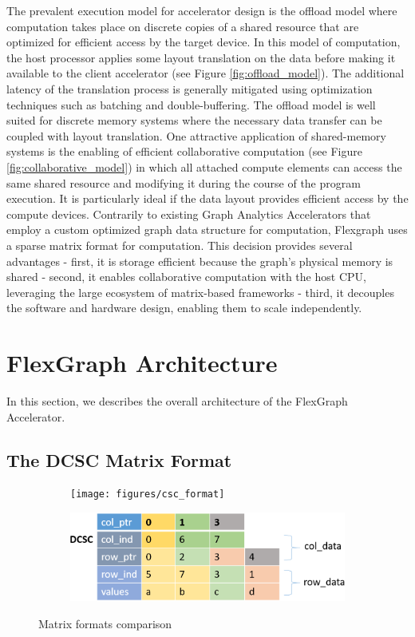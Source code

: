 The prevalent execution model for accelerator design is the offload model \cite{Accelerators} where computation takes place on discrete copies of a shared resource that are optimized for efficient access by the target device. In this model of computation, the host processor applies some layout translation on the data before making it available to the client accelerator (see Figure \ref{fig:offload_model}). The additional latency of the translation process is generally mitigated using optimization techniques such as batching and double-buffering. The offload model is well suited for discrete memory systems where the necessary data transfer can be coupled with layout translation. One attractive application of shared-memory systems is the enabling of efficient collaborative computation (see Figure \ref{fig:collaborative_model}) in which all attached compute elements can access the same shared resource and modifying it during the course of the program execution. It is particularly ideal if the data layout provides efficient access by the compute devices. Contrarily to existing Graph Analytics Accelerators \cite{Graphicionado} \cite{GraphOps} that employ a custom optimized graph data structure for computation, Flexgraph uses a sparse matrix format for computation. This decision provides several advantages - first, it is storage efficient because the graph's physical memory is shared - second, it enables collaborative computation with the host CPU, leveraging the large ecosystem of matrix-based frameworks \cite{CombBlas} \cite{Pegasus} - third, it decouples the software and hardware design, enabling them to scale independently.

\section{FlexGraph Architecture}

In this section, we describes the overall architecture of the FlexGraph Accelerator.

\subsection{The DCSC Matrix Format}

\begin{figure}[htbp]
\begin{subfigure}{0.5\textwidth}
    \texttt{[image: figures/csc\_format]}
    \vspace{0pt}
\end{subfigure}
\begin{subfigure}{0.33\textwidth}
    \includegraphics[width=\textwidth]{figures/dcsc_format}
\end{subfigure}
\caption{Matrix formats comparison}
\label{fig:DCSC_matrix_format}
\end{figure}

